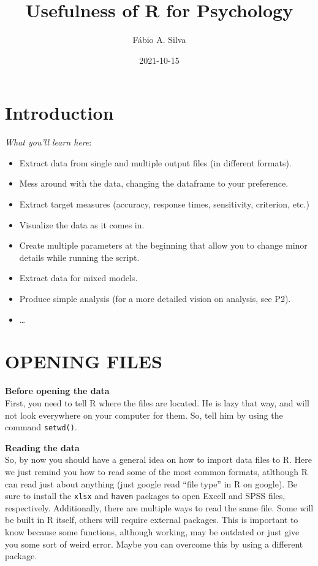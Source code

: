 \documentclass[
]{book}
\title{Usefulness of R for Psychology}
\author{Fábio A. Silva}
\date{2021-10-15}
\begin{document}
\maketitle

{
\setcounter{tocdepth}{1}
\tableofcontents
}
\hypertarget{introduction}{%
\chapter{Introduction}\label{introduction}}

\emph{What you'll learn here}:

\begin{itemize}
\item
  Extract data from single and multiple output files (in different formats).
\item
  Mess around with the data, changing the dataframe to your preference.
\item
  Extract target measures (accuracy, response times, sensitivity, criterion, etc.)
\item
  Visualize the data as it comes in.
\item
  Create multiple parameters at the beginning that allow you to change minor details while running the script.
\item
  Extract data for mixed models.
\item
  Produce simple analysis (for a more detailed vision on analysis, see P2).
\item
  \ldots{}
\end{itemize}

\hypertarget{opening-files}{%
\chapter{OPENING FILES}\label{opening-files}}

\textbf{Before opening the data}\\
First, you need to tell R where the files are located. He is lazy that way, and will not look everywhere on your computer for them. So, tell him by using the command \texttt{setwd()}.

\textbf{Reading the data}\\
So, by now you should have a general idea on how to import data files to R. Here we just remind you how to read some of the most common formats, atlthough R can read just about anything (just google read ``file type'' in R on google). Be sure to install the \texttt{xlsx} and \texttt{haven} packages to open Excell and SPSS files, respectively. Additionally, there are multiple ways to read the same file. Some will be built in R itself, others will require external packages. This is important to know because some functions, although working, may be outdated or just give you some sort of weird error. Maybe you can overcome this by using a different package.
\end{document}
